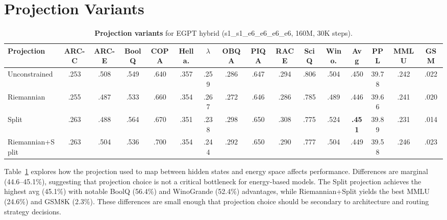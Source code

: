 \documentclass[oneside]{article}
\begin{document}
\section{Projection Variants}
\label{sec:proj}

\begin{table}[t]
\centering
\caption{\textbf{Projection variants} for EGPT hybrid (s1\_s1\_e6\_e6\_e6\_e6, 160M, 30K steps).}
\label{tab:proj}
\begin{adjustbox}{max width=\textwidth}
\begin{tabular}{l|ccccccccccc|c|c|cc}
\toprule
\textbf{Projection} & \textbf{ARC-C} & \textbf{ARC-E} & \textbf{BoolQ} & \textbf{COPA} & \textbf{Hella.} & \textbf{$\lambda$} & \textbf{OBQA} & \textbf{PIQA} & \textbf{RACE} & \textbf{SciQ} & \textbf{Wino.} & \textbf{Avg} & \textbf{PPL} & \textbf{MMLU} & \textbf{GSM} \\
\midrule
Unconstrained    & .253 & .508 & .549 & .640 & .357 & .259 & .286 & .647 & .294 & .806 & .504 & .450 & 39.78 & .242 & .022 \\
Riemannian       & .255 & .487 & .533 & .660 & .354 & .267 & .272 & .646 & .286 & .785 & .489 & .446 & 39.66 & .241 & .020 \\
Split            & .263 & .488 & .564 & .670 & .351 & .238 & .298 & .650 & .308 & .775 & .524 & \textbf{.451} & 39.89 & .231 & .014 \\
Riemannian+Split & .263 & .504 & .536 & .700 & .354 & .244 & .292 & .650 & .290 & .777 & .504 & .449 & 39.58 & .246 & .023 \\
\bottomrule
\end{tabular}
\end{adjustbox}
\end{table}

Table~\ref{tab:proj} explores how the projection used to map between hidden states and energy space affects performance. Differences are marginal (44.6--45.1\%), suggesting that projection choice is not a critical bottleneck for energy-based models. The Split projection achieves the highest avg (45.1\%) with notable BoolQ (56.4\%) and WinoGrande (52.4\%) advantages, while Riemannian+Split yields the best MMLU (24.6\%) and GSM8K (2.3\%). These differences are small enough that projection choice should be secondary to architecture and routing strategy decisions.


\end{document}
